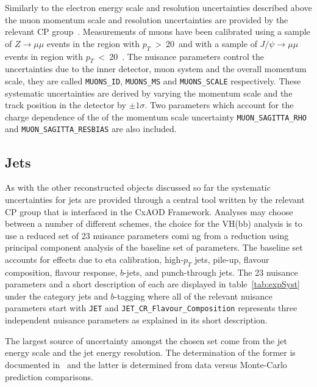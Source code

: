 Similarly to the electron energy scale and resolution uncertainties described
above the muon momentum scale and resolution uncertainties are provided by the
relevant CP group~\cite{muonTWiki}. Measurements of muons have been calibrated
using a sample of  $Z\rightarrow \mu\mu$ events in the region with
$p_T$~>~20~\GeV and with a sample of $J/\psi\rightarrow \mu\mu$ events in region
with $p_T$~<~20~\GeV. The nuisance parameters control the uncertainties due to
the inner detector, muon system and the overall momentum scale, they are called
\texttt{MUONS\_ID}, \texttt{MUONS\_MS} and \texttt{MUONS\_SCALE} respectively.
These systematic uncertainties are derived by varying the momentum scale and the
track position in the detector by $\pm 1\sigma$. Two parameters which account
for the charge dependence of the of the momentum scale uncertainty
\texttt{MUON\_SAGITTA\_RHO} and \texttt{MUON\_SAGITTA\_RESBIAS} are also included.

\subsection{Jets}
\label{sec:jetssys}

As with the other reconstructed objects discussed so far the systematic
uncertainties for jets are provided through a central tool written by the
relevant CP group that is interfaced in the CxAOD Framework. Analyses may choose
between a number of different schemes, the choice for the VH(bb) analysis is to
use a reduced set of 23 nuisance parameters comi
ng from a reduction using
principal component analysis of the baseline set of parameters. The baseline set
accounts for effects due to eta calibration, high-$p_T$ jets, pile-up, flavour
composition, flavour response, $b$-jets, and punch-through jets. The 23 nuisance
parameters and a short description of each are displayed in
table~\ref{tab:expSyst} under the category jets and $b$-tagging where all of the
relevant nuisance parameters start with \texttt{JET} and
\texttt{JET\_CR\_Flavour\_Composition} represents three independent nuisance
parameters as explained in its short description.

The largest source of uncertainty amongst the chosen set come from the jet
energy scale and the jet energy resolution. The determination of the former is
documented in~\cite{JetCalibration2015} and the latter is determined from data
versus Monte-Carlo prediction comparisons.

